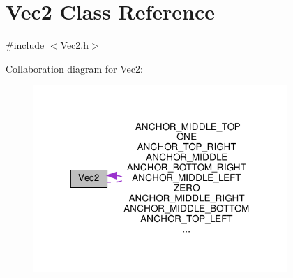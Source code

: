 \hypertarget{classVec2}{}\section{Vec2 Class Reference}
\label{classVec2}


{\ttfamily \#include $<$Vec2.\+h$>$}



Collaboration diagram for Vec2\+:
\nopagebreak
\begin{figure}[H]
\begin{center}
\leavevmode
\includegraphics[width=273pt]{classVec2__coll__graph}
\end{center}
\end{figure}
